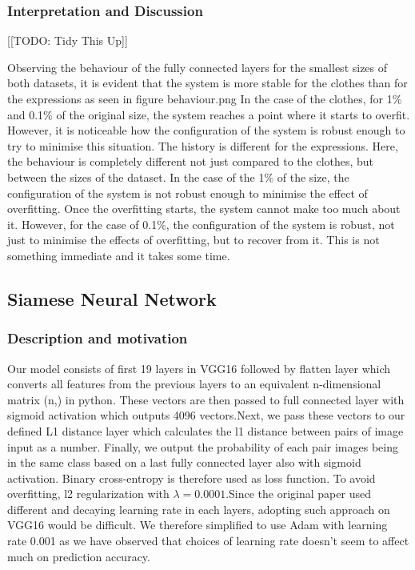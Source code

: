 \documentclass{article}
\begin{document}
\subsubsection{\textbf{Interpretation and Discussion}}

[[TODO: Tidy This Up]]

Observing the behaviour of the fully connected layers for the smallest sizes of both datasets, it is evident that the system is more stable for the clothes than for the expressions as seen in figure behaviour.png In the case of the clothes, for 1\% and 0.1\% of the original size, the system reaches a point where it starts to overfit. However, it is noticeable how the configuration of the system is robust enough to try to minimise this situation. The history is different for the expressions. Here, the behaviour is completely different not just compared to the clothes, but between the sizes of the dataset. In the case of the 1\% of the size, the configuration of the system is not robust enough to minimise the effect of overfitting. Once the overfitting starts, the system cannot make too much about it. However, for the case of 0.1\%, the configuration of the system is robust, not just to minimise the effects of overfitting, but to recover from it. This is not something immediate and it takes some time.

\subsection{Siamese Neural Network}


\subsubsection{\textbf{Description and motivation}}
Our model consists of first 19 layers in VGG16 followed by flatten layer which converts all features from the previous layers to
an equivalent n-dimensional matrix (n,) in python. These vectors are then passed to full connected layer with sigmoid activation which 
outputs 4096 vectors.Next, we pass these vectors to our defined L1 distance layer which calculates the l1 distance between pairs of
image input as a number. Finally, we output the probability of each pair images being in the same class based on a last fully connected
layer also with sigmoid activation. Binary cross-entropy is therefore used as loss function. To avoid overfitting, l2 regularization with
$\lambda=0.0001$.Since the original paper used different and decaying learning rate in each layers, adopting such approach on VGG16
would be difficult. We therefore simplified to use Adam with learning rate 0.001 as we have observed that choices of learning rate
doesn't seem to affect much on prediction accuracy. 
\end{document}

